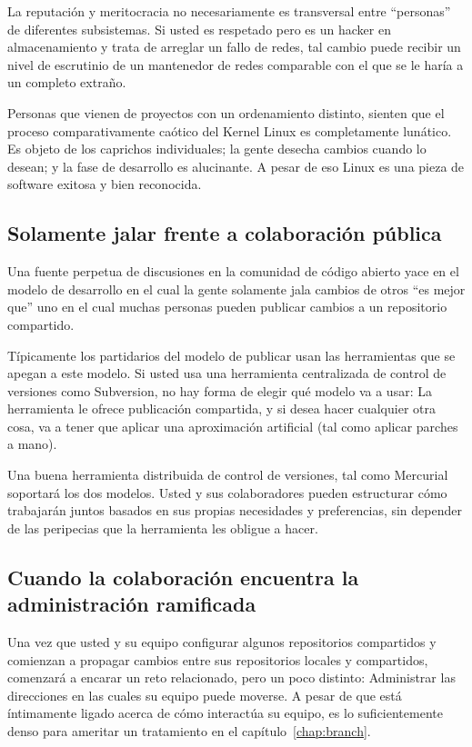 La reputación y meritocracia no necesariamente es transversal entre
``personas'' de diferentes subsistemas.  Si usted es respetado pero es
un hacker en almacenamiento y trata de arreglar un fallo de redes,
tal cambio puede recibir un nivel de escrutinio de un mantenedor de
redes comparable con el que se le haría a un completo extraño.

Personas que vienen de proyectos con un ordenamiento distinto, sienten
que el proceso comparativamente caótico del Kernel Linux es
completamente lunático.  Es objeto de los caprichos individuales; la
gente desecha cambios cuando lo desean; y la fase de desarrollo es
alucinante. A pesar de eso Linux es una pieza de software exitosa y
bien reconocida.

\subsection{Solamente jalar frente a colaboración pública}

Una fuente perpetua de discusiones en la comunidad de código abierto
yace en el modelo de desarrollo en el cual la gente solamente jala
cambios de otros ``es mejor que'' uno  en el cual muchas personas
pueden publicar cambios a un repositorio compartido.

Típicamente los partidarios del modelo de publicar usan las herramientas
que se apegan a este modelo.  Si usted usa una herramienta
centralizada de control de versiones como Subversion, no hay forma de
elegir qué modelo va a usar: La herramienta le ofrece publicación
compartida, y si desea hacer cualquier otra cosa, va a tener que
aplicar una aproximación artificial (tal como aplicar parches a mano).

Una buena herramienta distribuida de control de versiones, tal como
Mercurial soportará los dos modelos.   Usted y sus colaboradores
pueden estructurar cómo trabajarán juntos basados en sus propias
necesidades y preferencias,  sin depender de las peripecias que la
herramienta les obligue a hacer.

\subsection{Cuando la colaboración encuentra la administración ramificada}

Una vez que usted y su equipo configurar algunos repositorios
compartidos y comienzan a propagar cambios entre sus repositorios
locales y compartidos, comenzará a encarar un reto relacionado, pero
un poco distinto:  Administrar las direcciones en las cuales su equipo
puede moverse.   A pesar de que está íntimamente ligado acerca de cómo
interactúa su equipo, es lo suficientemente denso para ameritar un
tratamiento en el capítulo~\ref{chap:branch}.

